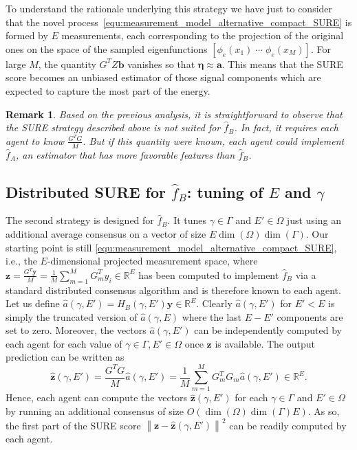 \documentclass[10pt,twocolumn,twoside]{IEEEtran}					%
\newcounter{generalCounter}
\theoremstyle	{plain}
\newtheorem		{remark}		[generalCounter]	{Remark}
\newcommand{\Reals}									[0]	{\mathbb{R}}
\begin{document}
To understand the rationale underlying this strategy we have just to consider that the novel process~\eqref{equ:measurement_model_alternative_compact_SURE} is formed by $E$ measurements, each corresponding to the projection of the original ones on the space of the sampled eigenfunctions $\left[ \phi_{e}(x_{1}) \; \cdots \; \phi_{e}(x_{M}) \right]$. For large $M$, the quantity $G^{T} Z {\bm{b}}$ vanishes so that $\bm{\eta} \approx \bm{a}$. This means that the \ac{SURE} score becomes an unbiased estimator of those signal components which are expected to capture the most part of the energy. 

\begin{remark}
	Based on the previous analysis, it is straightforward to observe that the \ac{SURE} strategy described above is not suited for $\widehat{f}_{B}$. In fact, it requires each agent to know $\frac{G^{T} G}{M}$. But if this quantity were known, each agent could implement $\widehat{f}_{A}$, an estimator that has more favorable features than $\widehat{f}_{B}$. 
\end{remark}


\subsection{Distributed \ac{SURE} for $\widehat{f}_{B}$: tuning of $E$ and $\gamma$}
\label{ssec:distributed_sure_for_widehat_f_b}


The second strategy is designed for $\widehat{f}_{B}$. It tunes $\gamma \in \Gamma$ and $E' \in \Omega$ just using an additional average consensus on a vector of size $E \dim(\Omega)\dim(\Gamma)$. Our starting point is still \eqref{equ:measurement_model_alternative_compact_SURE}, i.e., the $E$-dimensional projected measurement space, where $\bm{z} = \frac{G^{T} \bm{y}}{M} = \frac{1}{M}\sum_{m=1}^M G_m^Ty_i \in \Reals^E$ has been computed to implement $\widehat{f}_{B}$ via a standard distributed consensus algorithm and is therefore known to each agent. Let us define $\widehat{a}(\gamma,E')=H_{B}(\gamma,E') \bm{y} \in \Reals^E$. Clearly $\widehat{a}(\gamma,E')$ for $E'<E$ is simply the truncated version of $\widehat{a}(\gamma,E)$ where the last $E-E'$ components are set to zero. Moreover, the vectors $\widehat{a}(\gamma,E')$ can be independently computed by each agent for each value of $\gamma\in \Gamma,E'\in \Omega$ once $\bm{z}$ is available. The output prediction can be written as 
$$
	\widehat{\bm{z}}(\gamma,E')
	=
	\frac{G^{T} G}{M} \widehat{a}(\gamma,E')= \frac{1}{M}\sum_{m=1}^MG_m^TG_m \widehat{a}(\gamma,E')\in\Reals^E.
$$
Hence, each agent can compute the vectors $\widehat{\bm{z}}(\gamma,E')$ for each $\gamma \in \Gamma$ and $E' \in \Omega$ by running an additional consensus of size $O(\dim(\Omega) \dim(\Gamma) E)$. As so, the first part of the \ac{SURE} score $\left\| \bm{z} - \widehat{\bm{z}}(\gamma,E') \right\|^{2}$ can be readily computed by each agent.
\end{document}
